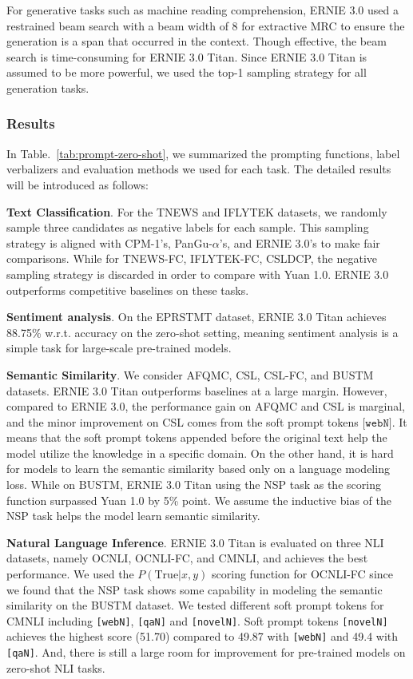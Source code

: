 For generative tasks such as machine reading comprehension, ERNIE 3.0 used a restrained beam search with a beam width of 8 for extractive MRC to ensure the generation is a span that occurred in the context. Though effective, the beam search is time-consuming for ERNIE 3.0 Titan. Since ERNIE 3.0 Titan is assumed to be more powerful, we used the top-1 sampling strategy for all generation tasks. 

\subsubsection{Results}

In Table.~\ref{tab:prompt-zero-shot}, we summarized the prompting functions, label verbalizers and evaluation methods we used for each task. The detailed results will be introduced as follows:

\textbf{Text Classification}. For the TNEWS and IFLYTEK datasets, we randomly sample three candidates as negative labels for each sample. This sampling strategy is aligned with CPM-1's, PanGu-$\alpha$'s, and ERNIE 3.0's to make fair comparisons. While for TNEWS-FC, IFLYTEK-FC, CSLDCP, the negative sampling strategy is discarded in order to compare with Yuan 1.0. ERNIE 3.0 outperforms competitive baselines on these tasks.

\textbf{Sentiment analysis}. On the EPRSTMT dataset, ERNIE 3.0 Titan achieves 88.75\% w.r.t. accuracy on the zero-shot setting, meaning sentiment analysis is a simple task for large-scale pre-trained models.

\textbf{Semantic Similarity}. We consider AFQMC, CSL, CSL-FC, and BUSTM datasets. ERNIE 3.0 Titan outperforms baselines at a large margin. However, compared to ERNIE 3.0, the performance gain on AFQMC and CSL is marginal, and the minor improvement on CSL comes from the soft prompt tokens $\texttt{[webN]}$. It means that the soft prompt tokens appended before the original text help the model utilize the knowledge in a specific domain. On the other hand, it is hard for models to learn the semantic similarity based only on a language modeling loss. While on BUSTM, ERNIE 3.0 Titan using the NSP task as the scoring function surpassed Yuan 1.0 by 5\% point. We assume the inductive bias of the NSP task helps the model learn semantic similarity.

\textbf{Natural Language Inference}. ERNIE 3.0 Titan is evaluated on three NLI datasets, namely OCNLI, OCNLI-FC, and CMNLI, and achieves the best performance. We used the $P(\text{True}|x, y)$ scoring function for OCNLI-FC since we found that the NSP task shows some capability in modeling the semantic similarity on the BUSTM dataset. We tested different soft prompt tokens for CMNLI including \texttt{[webN]}, \texttt{[qaN]} and \texttt{[novelN]}. Soft prompt tokens \texttt{[novelN]} achieves the highest score (51.70) compared to 49.87 with \texttt{[webN]} and 49.4 with \texttt{[qaN]}. And, there is still a large room for improvement for pre-trained models on zero-shot NLI tasks. 

